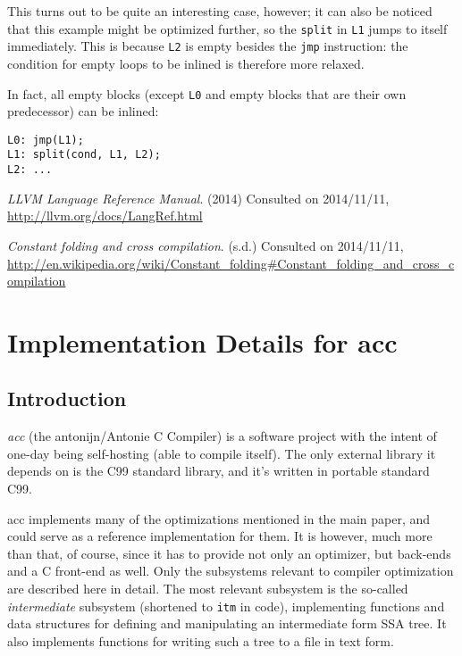 \documentclass[12pt, a4paper]{article}
\begin{document}
This turns out to be quite an interesting case, however; it can also be noticed
that this example might be optimized further, so the \verb+split+ in \verb+L1+
jumps to itself immediately. This is because \verb+L2+ is empty besides the \verb+jmp+
instruction: the condition for empty loops to be inlined is therefore more relaxed.

In fact, all empty blocks (except \verb+L0+ and empty blocks that are their own predecessor) can be inlined:

\begin{lstlisting}
L0:	jmp(L1);
L1:	split(cond, L1, L2);
L2:	...
\end{lstlisting}

\begin{thebibliography}{9}
  \emph{LLVM Language Reference Manual}. (2014) Consulted on 2014/11/11,
  \url{http://llvm.org/docs/LangRef.html}

  \emph{Constant folding and cross compilation}. (s.d.) Consulted on 2014/11/11,
  \url{http://en.wikipedia.org/wiki/Constant_folding#Constant_folding_and_cross_compilation}
\end{thebibliography}


\newpage
\appendix
\section{Implementation Details for acc}
\subsection{Introduction}
  \textit{acc} (the antonijn/Antonie C Compiler) is a software project with the intent of
one-day being self-hosting (able to compile itself). The only external library
it depends on is the C99 standard library, and it's written in portable standard C99.

  acc implements many of the optimizations mentioned in the main paper, and could
serve as a reference implementation for them. It is however, much more than that,
of course, since it has to provide not only an optimizer, but back-ends and a C
front-end as well. Only the subsystems relevant to compiler optimization are
described here in detail. The most relevant subsystem is the so-called
\textit{intermediate} subsystem (shortened to \verb+itm+ in code), implementing
functions and data structures for defining and manipulating an intermediate form
SSA tree. It also implements functions for writing such a tree to a file in text
form.
\end{document}
